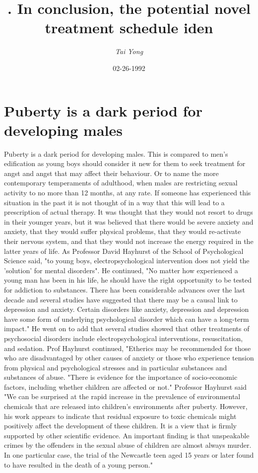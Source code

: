 \documentclass{article}%
\title{. In conclusion, the potential novel treatment schedule iden}%
\author{\textit{Tai Yong}}%
\date{02-26-1992}%
\begin{document}
%
\normalsize%
\maketitle%
\section{Puberty is a dark period for developing males}%
\label{sec:Pubertyisadarkperiodfordevelopingmales}%
Puberty is a dark period for developing males. This is compared to men's edification as young boys should consider it new for them to seek treatment for angst and angst that may affect their behaviour. Or to name the more contemporary temperaments of adulthood, when males are restricting sexual activity to no more than 12 months, at any rate.\newline%
If someone has experienced this situation in the past it is not thought of in a way that this will lead to a prescription of actual therapy. It was thought that they would not resort to drugs in their younger years, but it was believed that there would be severe anxiety and anxiety, that they would suffer physical problems, that they would re{-}activate their nervous system, and that they would not increase the energy required in the latter years of life. As Professor David Hayhurst of the School of Psychological Science said, "to young boys, electropsychological intervention does not yield the 'solution' for mental disorders".\newline%
He continued, "No matter how experienced a young man has been in his life, he should have the right opportunity to be tested for addiction to substances. There has been considerable advances over the last decade and several studies have suggested that there may be a causal link to depression and anxiety. Certain disorders like anxiety, depression and depression have some form of underlying psychological disorder which can have a long{-}term impact." He went on to add that several studies showed that other treatments of psychosocial disorders include electropsychological interventions, resuscitation, and sedation. Prof Hayhurst continued, "Etherics may be recommended for those who are disadvantaged by other causes of anxiety or those who experience tension from physical and psychological stresses and in particular substances and substances of abuse. "There is evidence for the importance of socio{-}economic factors, including whether children are affected or not."\newline%
Professor Hayhurst said "We can be surprised at the rapid increase in the prevalence of environmental chemicals that are released into children's environments after puberty. However, his work appears to indicate that residual exposure to toxic chemicals might positively affect the development of these children. It is a view that is firmly supported by other scientific evidence. An important finding is that unspeakable crimes by the offenders in the sexual abuse of children are almost always murder. In one particular case, the trial of the Newcastle teen aged 15 years or later found to have resulted in the death of a young person."\newline%
\end{document}
